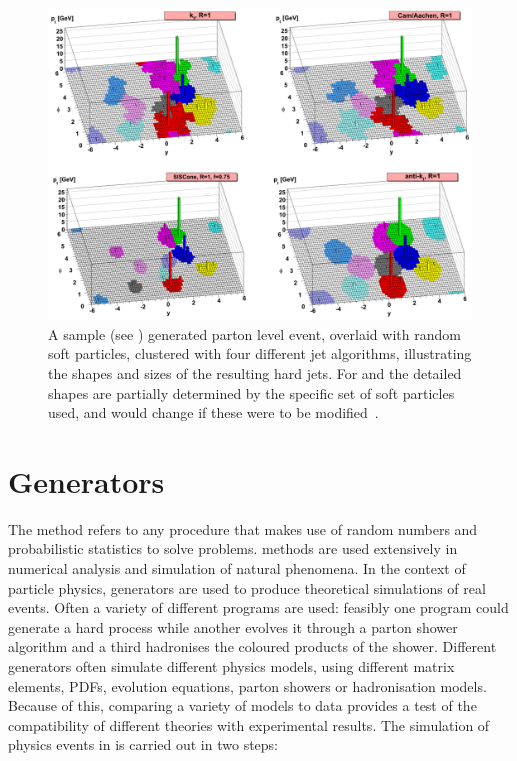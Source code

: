 \begin{figure}[htpb]
  \includegraphics[width=\largefigwidth]{chapters/bg-theory/JetAlgComparison.eps}
  \caption{A sample \Herwig (see ) generated parton level event, overlaid with random soft particles, clustered with four different jet algorithms, illustrating the shapes and sizes of the resulting hard jets. For \kt and \CA the detailed shapes are partially determined by the specific set of soft particles used, and would change if these were to be modified~\cite{Cacciari:2005:fastjet,Cacciari:2012:fastjet}.}
  \label{fig:bg-theory:jet_algorithms}
\end{figure}

\section{\MC Generators}
\label{sec:bg-theory:MC_generators}
The \MC method refers to any procedure that makes use of random numbers and probabilistic statistics to solve problems.
\MC methods are used extensively in numerical analysis and simulation of natural phenomena.
In the context of particle physics, \MC generators are used to produce theoretical simulations of real events.
Often a variety of different programs are used: feasibly one program could generate a hard process while another evolves it through a parton
shower algorithm and a third hadronises the coloured products of the shower.
Different \MC generators often simulate different physics models, using different matrix elements, PDFs, evolution equations, parton showers or
hadronisation models.
Because of this, comparing a variety of \MC models to data provides a test of the compatibility of different theories with experimental results.
The simulation of physics events in \ATLAS is carried out in two steps:


